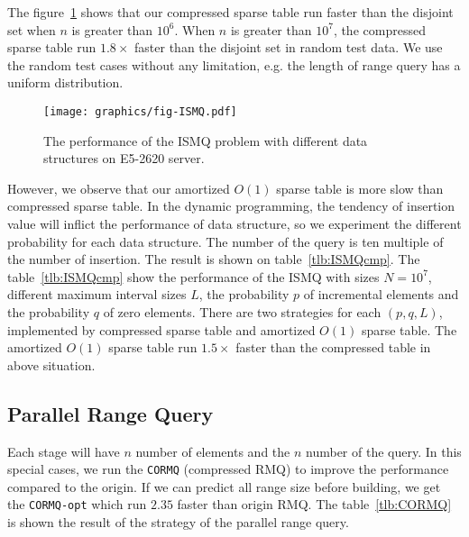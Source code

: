The figure~\ref{fig:fig-ISMQcmp} shows that our compressed sparse table
run faster than the disjoint set when $n$ is greater than  $10^6$.  When
$n$ is greater than $10^7$, the compressed sparse table run $1.8 \times$
faster than the disjoint set in random test data.  We use the
random test cases without any limitation, e.g. the length of range
query has a uniform distribution.

\begin{figure}[!thb]
  \centering
  \texttt{[image: graphics/fig-ISMQ.pdf]}
  \caption{
  The performance of the ISMQ problem with different data structures on 
  E5-2620 server.
  }
  \label{fig:fig-ISMQcmp}
\end{figure}

However, we observe that our amortized $O(1)$ sparse table is more slow
than compressed sparse table.  In the dynamic programming, the tendency
of insertion value will inflict the performance of data structure, so we
experiment the different probability for each data structure.  The
number of the query is ten multiple of the number of insertion.  The
result is shown on table~\ref{tlb:ISMQcmp}.  The table~\ref{tlb:ISMQcmp}
show the performance of the ISMQ with sizes $N = 10^7$, different
maximum interval sizes $L$, the probability $p$ of incremental elements
and the probability $q$ of zero elements. There are two strategies for
each $(p, q, L)$, implemented by compressed sparse table and amortized
$O(1)$ sparse table.  The amortized $O(1)$ sparse table run $1.5 \times$
faster than the compressed table in above situation.

\iffalse
當運行 $n > 10^6$ 時，我們提出的壓縮稀疏表的效能已經勝過并查集的版本，
其運行結果如圖表 ~\ref{fig:fig-ISMQcmp}。在 $n = 10^7$ 時，加速 $1.25 \times$。
然而，我們提供的 amortized $\theta(1)$ 的稀疏表慢於并查集，
我們做了深入的機率探討 (參照表 ~\ref{tlb:ISMQcmp})，由於大部分的操作都被區塊後綴和前綴解決，
沒有實際運用到內部詢問，約束區間詢問的大小為 $L$，在 $N = 10^7$ 時，最多能加速 $1.26 \times$，
其中插入和詢問比例為 1:10，當詢問比重更大時，將有更明顯的加速。
\fi



\subsection{Parallel Range Query}

Each stage will have $n$ number of elements and the $n$ number of the
query.  In this special cases, we run the {\tt CORMQ} (compressed RMQ)
to improve the performance compared to the origin.  If we can predict
all range size before building, we get the {\tt CORMQ-opt} which run
$2.35$ faster than origin RMQ.  The table~\ref{tlb:CORMQ} is shown the
result of the strategy of the parallel range query.

\iffalse
每一次有 $n$ 個元素和 $n$ 組詢問，針對這種特殊性質的問題，
我們運行樸素的 \texttt{CORMQ} (compressed RMQ) 得到效能改善，
搭配可預測的分析降低運算量 (參照 \texttt{CORMQ-opt})，得到更好的改善。
在 \texttt{CORMQ-opt} 策略中，得到 $2.35 \times$ 倍的加速，結果如表 ~\ref{tlb:CORMQ}。
\fi


